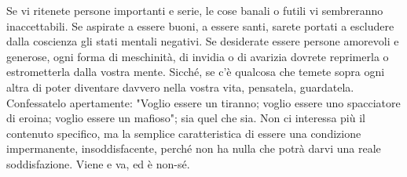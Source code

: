 Se vi ritenete persone importanti e serie, le cose banali o futili vi
sembreranno inaccettabili. Se aspirate a essere buoni, a essere santi,
sarete portati a escludere dalla coscienza gli stati mentali negativi.
Se desiderate essere persone amorevoli e generose, ogni forma di
meschinità, di invidia o di avarizia dovrete reprimerla o estrometterla
dalla vostra mente. Sicché, se c'è qualcosa che temete sopra ogni altra
di poter diventare davvero nella vostra vita, pensatela, guardatela.
Confessatelo apertamente: "Voglio essere un tiranno; voglio essere uno
spacciatore di eroina; voglio essere un mafioso"; sia quel che sia. Non
ci interessa più il contenuto specifico, ma la semplice caratteristica
di essere una condizione impermanente, insoddisfacente, perché non ha
nulla che potrà darvi una reale soddisfazione. Viene e va, ed è non-sé.
